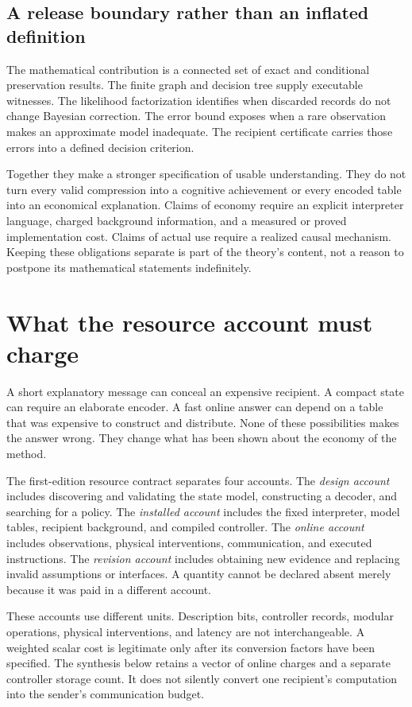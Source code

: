 \documentclass[11pt,letterpaper]{article}
\theoremstyle{plain}
\theoremstyle{definition}
\begin{document}
\subsection{A release boundary rather than an inflated definition}
The mathematical contribution is a connected set of exact and conditional preservation results. The finite graph and decision tree supply executable witnesses. The likelihood factorization identifies when discarded records do not change Bayesian correction. The error bound exposes when a rare observation makes an approximate model inadequate. The recipient certificate carries those errors into a defined decision criterion.

Together they make a stronger specification of usable understanding. They do not turn every valid compression into a cognitive achievement or every encoded table into an economical explanation. Claims of economy require an explicit interpreter language, charged background information, and a measured or proved implementation cost. Claims of actual use require a realized causal mechanism. Keeping these obligations separate is part of the theory's content, not a reason to postpone its mathematical statements indefinitely.


\section{What the resource account must charge}\label{sec:resources}
A short explanatory message can conceal an expensive recipient. A compact state can require an elaborate encoder. A fast online answer can depend on a table that was expensive to construct and distribute. None of these possibilities makes the answer wrong. They change what has been shown about the economy of the method.

The first-edition resource contract separates four accounts. The \emph{design account} includes discovering and validating the state model, constructing a decoder, and searching for a policy. The \emph{installed account} includes the fixed interpreter, model tables, recipient background, and compiled controller. The \emph{online account} includes observations, physical interventions, communication, and executed instructions. The \emph{revision account} includes obtaining new evidence and replacing invalid assumptions or interfaces. A quantity cannot be declared absent merely because it was paid in a different account.

These accounts use different units. Description bits, controller records, modular operations, physical interventions, and latency are not interchangeable. A weighted scalar cost is legitimate only after its conversion factors have been specified. The synthesis below retains a vector of online charges and a separate controller storage count. It does not silently convert one recipient's computation into the sender's communication budget.
\end{document}
